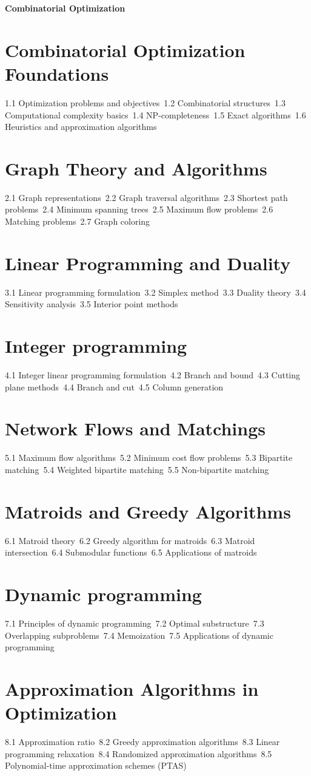 {\LARGE \bf{Combinatorial Optimization}}
\section{Combinatorial Optimization Foundations}
1.1 Optimization problems and objectives\
1.2 Combinatorial structures\
1.3 Computational complexity basics\
1.4 NP-completeness\
1.5 Exact algorithms\
1.6 Heuristics and approximation algorithms\
\section{Graph Theory and Algorithms}
2.1 Graph representations\
2.2 Graph traversal algorithms\
2.3 Shortest path problems\
2.4 Minimum spanning trees\
2.5 Maximum flow problems\
2.6 Matching problems\
2.7 Graph coloring\
\section{Linear Programming and Duality}
3.1 Linear programming formulation\
3.2 Simplex method\
3.3 Duality theory\
3.4 Sensitivity analysis\
3.5 Interior point methods\
\section{Integer programming}
4.1 Integer linear programming formulation\
4.2 Branch and bound\
4.3 Cutting plane methods\
4.4 Branch and cut\
4.5 Column generation\
\section{Network Flows and Matchings}
5.1 Maximum flow algorithms\
5.2 Minimum cost flow problems\
5.3 Bipartite matching\
5.4 Weighted bipartite matching\
5.5 Non-bipartite matching\
\section{Matroids and Greedy Algorithms}
6.1 Matroid theory\
6.2 Greedy algorithm for matroids\
6.3 Matroid intersection\
6.4 Submodular functions\
6.5 Applications of matroids\
\section{Dynamic programming}
7.1 Principles of dynamic programming\
7.2 Optimal substructure\
7.3 Overlapping subproblems\
7.4 Memoization\
7.5 Applications of dynamic programming\
\section{Approximation Algorithms in Optimization}
8.1 Approximation ratio\
8.2 Greedy approximation algorithms\
8.3 Linear programming relaxation\
8.4 Randomized approximation algorithms\
8.5 Polynomial-time approximation schemes (PTAS)\
